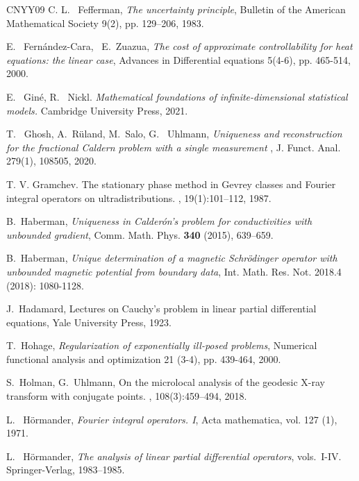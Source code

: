 \documentclass[12pt,twoside]{amsart}
\numberwithin{equation}{section}
\begin{document}
\begin{thebibliography}{CNYY09}
C. L. \ Fefferman, \textit{{The uncertainty principle}}, Bulletin of the American Mathematical Society 9(2), pp. 129--206, 1983.

E. \ Fern{\'a}ndez-Cara, \ E.\ Zuazua, \textit{{The cost of approximate controllability for heat equations: the linear case}}, Advances in Differential equations 5(4-6), pp. 465-514, 2000.

E. \ Gin\'e, R. \ Nickl. \emph{Mathematical foundations of infinite-dimensional statistical models.} Cambridge University Press, 2021.

T. \ Ghosh, A.\ R{\"u}land, M.\ Salo, G. \ Uhlmann, \textit{{Uniqueness and reconstruction for the fractional Caldern problem with a single measurement }},
J. Funct. Anal. 279(1), 108505, 2020.


T. V. Gramchev.
\newblock The stationary phase method in {G}evrey classes and {F}ourier integral operators on ultradistributions.
, 19(1):101--112, 1987.


B.\ Haberman, \textit{{Uniqueness in Calder\'on's problem for conductivities with unbounded gradient}}, Comm. Math. Phys. {\bf 340} (2015), 639--659.

B.\ Haberman, \textit{{Unique determination of a magnetic Schr\"odinger operator with unbounded magnetic potential from boundary data}}, Int. Math. Res. Not. 2018.4 (2018): 1080-1128.

J.\ Hadamard, Lectures on Cauchy's problem in linear partial differential equations, Yale University Press, 1923.



T.\ Hohage, \textit{Regularization of exponentially ill-posed problems}, Numerical functional analysis and optimization 21 (3-4), pp. 439-464, 2000.




S.\ Holman, G.\ Uhlmann,
\newblock On the microlocal analysis of the geodesic X-ray transform with conjugate points.
, 108(3):459--494, 2018.

L. \ H\"ormander, \textit{Fourier integral operators. I},
Acta mathematica, vol. 127 (1), 1971.

L. \ H\"ormander, \textit{The analysis of linear partial differential operators}, vols.\ I-IV. Springer-Verlag, 1983--1985.


\end{thebibliography}
\end{document}
